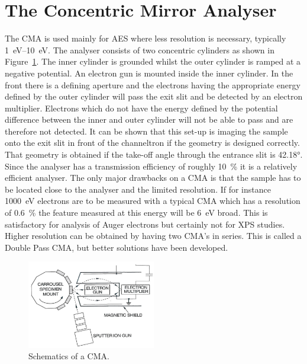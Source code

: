 \section{The Concentric Mirror Analyser}
The CMA is used mainly for AES where less resolution is necessary, typically \SIrange{1}{10}{\electronvolt}. The analyser consists of two concentric cylinders as shown in Figure~\ref{fig:schematics_cma}. The inner cylinder is grounded whilst the outer cylinder is ramped at a negative potential. An electron gun is mounted inside the inner cylinder. In the front there is a defining aperture and the electrons having the appropriate energy defined by the outer cylinder will pass the exit slit and be detected by an electron multiplier. Electrons which do not have the energy defined by the potential difference between the inner and outer cylinder will not be able to pass and are therefore not detected. It can be shown that this set-up is imaging the sample onto the exit slit in front of the channeltron if the geometry is designed correctly. That geometry is obtained if the take-off angle through the entrance slit is \ang{42.18}. Since the analyser has a transmission efficiency of roughly \SI{10}{\percent} it is a relatively efficient analyser. The only major drawbacks on a CMA is that the sample has to be located close to the analyser and the limited resolution. If for instance \SI{1000}{\electronvolt} electrons are to be measured with a typical CMA which has a resolution of \SI{0.6}{\percent} the feature measured at this energy will be \SI{6}{\electronvolt} broad. This is satisfactory for analysis of Auger electrons but certainly not for XPS studies. Higher resolution can be obtained by having two CMA's in series. This is called a Double Pass CMA, but better solutions have been developed.

\begin{figure}[htbp]
\centering
\includegraphics[width=0.5\textwidth]{figures/03_01}
\caption{Schematics of a CMA.}
\label{fig:schematics_cma}
\end{figure}

